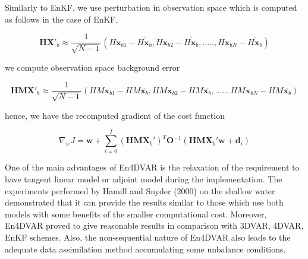 \documentclass[a4,12pt]{article}
\numberwithin{equation}{section}
\begin{document}
Similarly to EnKF, we use perturbation in observation space which is computed as follows in the case of EnKF,

$$\textbf{HX}'_{b} \approx \frac{1}{\sqrt{N-1}}(H\textbf{x}_{b1}-\overline{H\textbf{x}_{b}},H\textbf{x}_{b2}-\overline{H\textbf{x}_{b}},.....,H\textbf{x}_{bN}-\overline{H\textbf{x}_{b}})$$

we compute observation space background error

$$\textbf{HMX}'_{b} \approx \frac{1}{\sqrt{N-1}}(HM\textbf{x}_{b1}-HM\overline{\textbf{x}_{b}}, HM\textbf{x}_{b2}-HM\overline{\textbf{x}_{b}},.....,HM\textbf{x}_{bN}-HM\overline{\textbf{x}_{b}} )$$

hence, we have the recomputed gradient of the cost function

$$\nabla _{w}J = \textbf{w} + \sum_{i=0}^{I}(\textbf{HMX}_{b}')^{T}\textbf{O}^{-1}(\textbf{HMX}_{b}'\textbf{w}+\textbf{d}_{i})$$


One of the main advantages of En4DVAR is the relaxation of the requirement to have tangent linear model or adjoint model during the implementation. The experiments performed by Hamill and Snyder (2000) on the shallow water demonstrated that it can  provide the results similar to those which use both models with some benefits of the smaller computational cost. Moreover, En4DVAR proved to give reasonable results in comparison with 3DVAR, 4DVAR, EnKF schemes. Also, the non-sequential nature of En4DVAR also leads to the adequate data assimilation method accumulating some unbalance conditions.  
\end{document}
